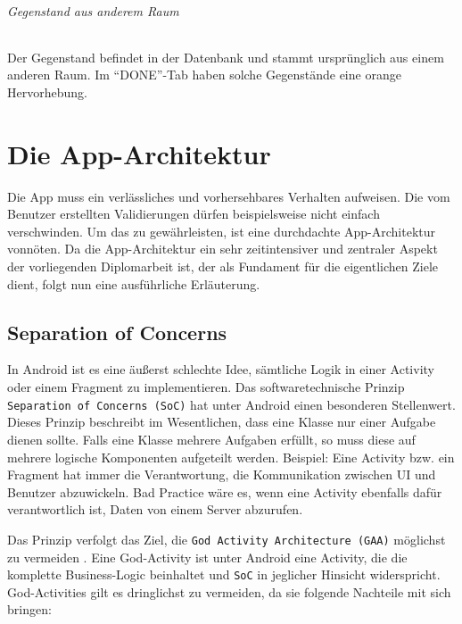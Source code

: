 \hypertarget{gegenstand-aus-anderem-raum}{%
\subparagraph{Gegenstand aus anderem
Raum}\label{gegenstand-aus-anderem-raum}}

Der Gegenstand befindet in der Datenbank und stammt ursprünglich aus
einem anderen Raum. Im ``DONE''-Tab haben solche Gegenstände eine orange
Hervorhebung.

\chapter{Die App-Architektur}
\label{die_app_architektur}

Die App muss ein verlässliches und vorhersehbares Verhalten aufweisen.
Die vom Benutzer erstellten Validierungen dürfen beispielsweise nicht
einfach verschwinden. Um das zu gewährleisten, ist eine durchdachte
App-Architektur vonnöten. Da die App-Architektur ein sehr zeitintensiver
und zentraler Aspekt der vorliegenden Diplomarbeit ist, der als
Fundament für die eigentlichen Ziele dient, folgt nun eine ausführliche
Erläuterung.

\hypertarget{separation-of-concerns}{%
\section{Separation of Concerns}\label{separation-of-concerns}}

In Android ist es eine äußerst schlechte Idee, sämtliche Logik in einer
Activity oder einem Fragment zu implementieren. Das softwaretechnische
Prinzip \texttt{Separation\ of\ Concerns\ (SoC)} hat unter Android einen
besonderen Stellenwert. Dieses Prinzip beschreibt im Wesentlichen, dass
eine Klasse nur einer Aufgabe dienen sollte. Falls eine Klasse mehrere
Aufgaben erfüllt, so muss diese auf mehrere logische Komponenten
aufgeteilt werden. Beispiel: Eine Activity bzw. ein Fragment hat immer
die Verantwortung, die Kommunikation zwischen UI und Benutzer
abzuwickeln. Bad Practice wäre es, wenn eine Activity ebenfalls dafür
verantwortlich ist, Daten von einem Server abzurufen.

Das Prinzip verfolgt das Ziel, die
\texttt{God\ Activity\ Architecture\ (GAA)} möglichst zu vermeiden
\cite{god-activities}. Eine God-Activity ist unter Android eine
Activity, die die komplette Business-Logic beinhaltet und \texttt{SoC}
in jeglicher Hinsicht widerspricht. God-Activities gilt es dringlichst
zu vermeiden, da sie folgende Nachteile mit sich bringen:

